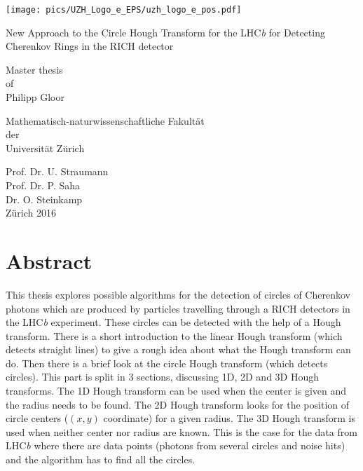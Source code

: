 \documentclass[11pt,twoside]{scrreprt}
\begin{document}
\begin{titlepage}
  \texttt{[image: pics/UZH\_Logo\_e\_EPS/uzh\_logo\_e\_pos.pdf]}
  \vspace{1cm}

  \Huge\centering New Approach to the Circle Hough Transform for the LHC\textit{b} for Detecting
        Cherenkov Rings in the RICH detector

  \noindent\makebox[\textwidth]{\rule{\textwidth}{0.4pt}}

\vspace{1cm}

{\centering
  \Large Master thesis\\
  of\\
  Philipp Gloor
  \vspace{1.5cm}

  \Large Mathematisch-naturwissenschaftliche Fakultät\\
  der\\
  Universität Zürich
  \vspace{2cm}

  \Large Prof. Dr. U. Straumann\\
  Prof. Dr. P. Saha\\
  Dr. O. Steinkamp\\
\vspace*{\fill}
\Large Zürich 2016


  }
\end{titlepage}
\chapter*{Abstract}
This thesis explores possible algorithms for the detection of circles of Cherenkov photons which are produced by particles 
travelling through a RICH detectors in the LHC\textit{b} experiment. These circles can be detected with the help of a Hough 
transform. There is a short introduction to the linear Hough transform (which detects straight lines) to give a rough idea about 
what the Hough transform can do. Then there is a brief look at the circle Hough transform (which detects circles). This part is 
split in 3 sections, discussing 1D, 2D and 3D Hough transforms. The 1D Hough transform can be used when the center is given and the radius 
needs to be found. The 2D Hough transform looks for the position of circle centers ($(x,y)$ coordinate) for a given radius. 
The 3D Hough transform is used when neither center nor radius are known. This is the case for the data from LHC\textit{b} 
where there are data points (photons from several circles and noise hits) and the algorithm has to find all the circles.
\end{document}

